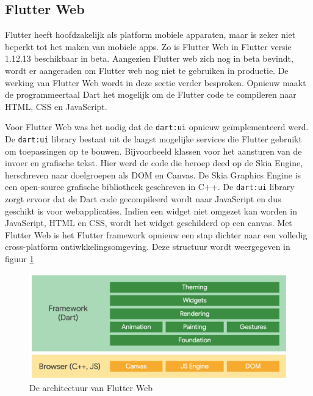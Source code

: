 \subsection{Flutter Web}
Flutter heeft hoofdzakelijk als platform mobiele apparaten, maar is zeker niet beperkt tot het maken van mobiele apps. Zo is Flutter Web in Flutter versie 1.12.13 beschikbaar in beta. Aangezien Flutter web zich nog in beta bevindt, wordt er aangeraden om Flutter web nog niet te gebruiken in productie. De werking van Flutter Web wordt in deze sectie verder besproken.
\newline
Opnieuw maakt de programmeertaal Dart het mogelijk om de Flutter code te compileren naar HTML, CSS en JavaScript.

Voor Flutter Web was het nodig dat de \verb|dart:ui| opnieuw geïmplementeerd werd. De \verb|dart:ui| library bestaat uit de laagst mogelijke services die Flutter gebruikt om toepassingen op te bouwen. Bijvoorbeeld klassen voor het aansturen van de invoer en grafische tekst. Hier werd de code die beroep deed op de Skia Engine, herschreven naar doelgroepen als DOM en Canvas. De Skia Graphics Engine is een open-source grafische bibliotheek geschreven in C++. De \verb|dart:ui| library zorgt ervoor dat de Dart code gecompileerd wordt naar JavaScript en dus geschikt is voor webapplicaties. Indien een widget niet omgezet kan worden in JavaScript, HTML en CSS, wordt het widget geschilderd op een canvas.
\newline
Met Flutter Web is het Flutter framework opnieuw een stap dichter naar een volledig cross-platform ontiwkkelingsomgeving.
Deze structuur wordt weergegeven in figuur \ref{fig:flutter-web-architecture}
\begin{figure}[H]
    \includegraphics[width=\linewidth]{img/stand-van-zaken/flutter-web-architecture.png}
    \caption{De architectuur van Flutter Web \autocite{Flutter2019}}
    \label{fig:flutter-web-architecture}
\end{figure}


